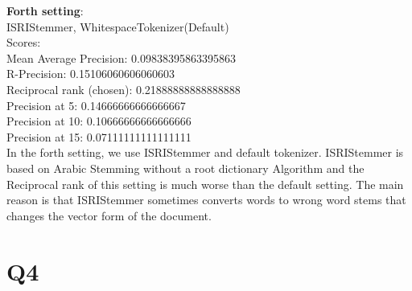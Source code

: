 \documentclass{article}
\begin{document}
\noindent
\textbf{Forth setting}:\\
ISRIStemmer, WhitespaceTokenizer(Default)\\
Scores:\\
Mean Average Precision: 0.09838395863395863\\
R-Precision: 0.15106060606060603\\
Reciprocal rank (chosen): 0.21888888888888888\\
Precision at 5: 0.14666666666666667\\
Precision at 10: 0.10666666666666666\\
Precision at 15: 0.07111111111111111\\

In the forth setting, we use ISRIStemmer and default tokenizer. ISRIStemmer is
based on Arabic Stemming without a root dictionary Algorithm and the Reciprocal 
rank of this setting is much worse than the default setting. The main reason is 
that ISRIStemmer sometimes converts words to wrong word stems that changes the 
vector form of the document.

\section*{Q4}
\end{document}
